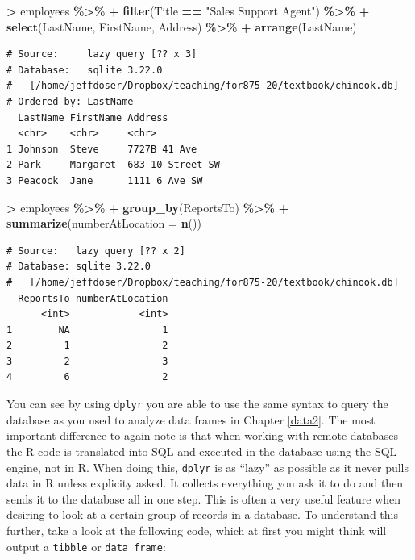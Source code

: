 \documentclass[
]{krantz}
\makeatletter
\newenvironment{Shaded}{\begin{snugshade}}{\end{snugshade}}
\newcommand{\DataTypeTok}[1]{\textcolor[rgb]{0.27,0.27,0.27}{#1}}
\newcommand{\KeywordTok}[1]{\textcolor[rgb]{0.27,0.27,0.27}{\textbf{#1}}}
\newcommand{\NormalTok}[1]{#1}
\newcommand{\OperatorTok}[1]{\textcolor[rgb]{0.43,0.43,0.43}{\textbf{#1}}}
\newcommand{\StringTok}[1]{\textcolor[rgb]{0.5,0.5,0.5}{#1}}
\newenvironment{kframe}{%
\medskip{}
\setlength{\fboxsep}{.8em}
 \def\at@end@of@kframe{}%
 \ifinner\ifhmode%
  \def\at@end@of@kframe{\end{minipage}}%
  \begin{minipage}{\columnwidth}%
 \fi\fi%
 \def\FrameCommand##1{\hskip\@totalleftmargin \hskip-\fboxsep
 \colorbox{shadecolor}{##1}\hskip-\fboxsep
     \hskip-\linewidth \hskip-\@totalleftmargin \hskip\columnwidth}%
 \MakeFramed {\advance\hsize-\width
   \@totalleftmargin\z@ \linewidth\hsize
   \@setminipage}}%
 {\par\unskip\endMakeFramed%
 \at@end@of@kframe}
\renewenvironment{Shaded}{\begin{kframe}}{\end{kframe}}
\makeatother
\begin{document}
\begin{Shaded}
\begin{Highlighting}[]
\OperatorTok{\textgreater{}}\StringTok{ }\NormalTok{employees }\OperatorTok{\%\textgreater{}\%}\StringTok{ }
\OperatorTok{+}\StringTok{   }\KeywordTok{filter}\NormalTok{(Title }\OperatorTok{==}\StringTok{ "Sales Support Agent"}\NormalTok{) }\OperatorTok{\%\textgreater{}\%}\StringTok{ }
\OperatorTok{+}\StringTok{   }\KeywordTok{select}\NormalTok{(LastName, FirstName, Address) }\OperatorTok{\%\textgreater{}\%}\StringTok{ }
\OperatorTok{+}\StringTok{   }\KeywordTok{arrange}\NormalTok{(LastName)}
\end{Highlighting}
\end{Shaded}

\begin{verbatim}
# Source:     lazy query [?? x 3]
# Database:   sqlite 3.22.0
#   [/home/jeffdoser/Dropbox/teaching/for875-20/textbook/chinook.db]
# Ordered by: LastName
  LastName FirstName Address         
  <chr>    <chr>     <chr>           
1 Johnson  Steve     7727B 41 Ave    
2 Park     Margaret  683 10 Street SW
3 Peacock  Jane      1111 6 Ave SW   
\end{verbatim}

\begin{Shaded}
\begin{Highlighting}[]
\OperatorTok{\textgreater{}}\StringTok{ }\NormalTok{employees }\OperatorTok{\%\textgreater{}\%}\StringTok{ }
\OperatorTok{+}\StringTok{   }\KeywordTok{group\_by}\NormalTok{(ReportsTo) }\OperatorTok{\%\textgreater{}\%}\StringTok{ }
\OperatorTok{+}\StringTok{   }\KeywordTok{summarize}\NormalTok{(}\DataTypeTok{numberAtLocation =} \KeywordTok{n}\NormalTok{())}
\end{Highlighting}
\end{Shaded}

\begin{verbatim}
# Source:   lazy query [?? x 2]
# Database: sqlite 3.22.0
#   [/home/jeffdoser/Dropbox/teaching/for875-20/textbook/chinook.db]
  ReportsTo numberAtLocation
      <int>            <int>
1        NA                1
2         1                2
3         2                3
4         6                2
\end{verbatim}

You can see by using \texttt{dplyr} you are able to use the same syntax to query the database as you used to analyze data frames in Chapter \ref{data2}. The most important difference to again note is that when working with remote databases the R code is translated into SQL and executed in the database using the SQL engine, not in R. When doing this, \texttt{dplyr} is as ``lazy'' as possible as it never pulls data in R unless explicity asked. It collects everything you ask it to do and then sends it to the database all in one step. This is often a very useful feature when desiring to look at a certain group of records in a database. To understand this further, take a look at the following code, which at first you might think will output a \texttt{tibble} or \texttt{data\ frame}:
\end{document}
